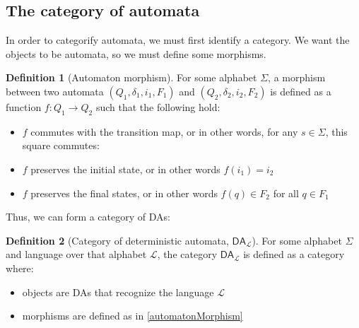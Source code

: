 \documentclass{article}
\theoremstyle{plain}
\theoremstyle{definition}
\newtheorem{definition}{Definition}
\begin{document}
\subsection{The category of automata}


In order to categorify automata, we must first identify a category. We want the objects to be automata, so we must define some morphisms.

\begin{definition}[Automaton morphism]
 For some alphabet \ensuremath{\Sigma}, a morphism between two automata \ensuremath{\left( {Q}_{1}, {\delta }_{1}, {i}_{1}, {F}_{1} \right)} and \ensuremath{\left( {Q}_{2}, {\delta }_{2}, {i}_{2}, {F}_{2} \right)} is defined as a function \ensuremath{f : {Q}_{1} \rightarrow {Q}_{2}} such that the following hold:

\begin{itemize}
\item \ensuremath{f} commutes with the transition map, or in other words, for any \ensuremath{s \in \Sigma}, this square commutes: 
\begin{center}
\end{center}

\item \ensuremath{f} preserves the initial state, or in other words \ensuremath{f\left( {i}_{1} \right) = {i}_{2}}
\item \ensuremath{f} preserves the final states, or in other words \ensuremath{f\left( q \right) \in {F}_{2}} for all \ensuremath{q \in {F}_{1}}
\end{itemize}


 
\end{definition}
\label{automatonMorphism} 

Thus, we can form a category of DAs:

\begin{definition}[Category of deterministic automata, \ensuremath{{\mathsf{DA}}_{\mathcal{L}}}]
 For some alphabet \ensuremath{\Sigma} and language over that alphabet \ensuremath{\mathcal{L}}, the category \ensuremath{{\mathsf{DA}}_{\mathcal{L}}} is defined as a category where: \begin{itemize}
\item objects are DAs that recognize the language \ensuremath{\mathcal{L}}
\item morphisms are defined as in \ref{automatonMorphism}
\end{itemize}

\end{definition}
\end{document}
